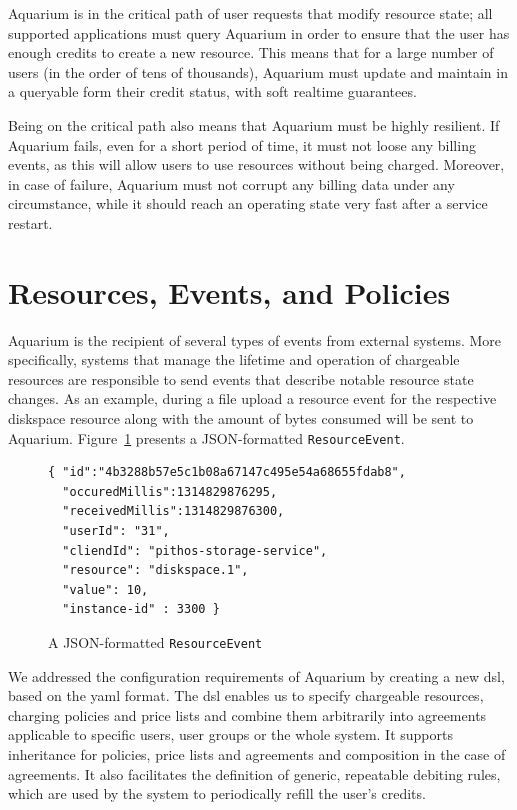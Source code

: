 \documentclass[letterpaper,twocolumn,10pt]{article}
\begin{document}
Aquarium is in the critical path of user requests that modify resource
state; all supported applications must query Aquarium in order to
ensure that the user has enough credits to create a new resource. This
means that for a large number of users (in the order of tens of thousands),
Aquarium must update and maintain in a queryable form their credit
status, with soft realtime guarantees.

Being on the critical path also means that Aquarium must be highly
resilient. If Aquarium fails, even for a short period of time, it must
not loose any billing events, as this will allow users to use
resources without being charged. Moreover, in case of failure,
Aquarium must not corrupt any billing data under any circumstance,
while it should reach an operating state very fast after a service
restart.

\section{Resources, Events, and Policies}

Aquarium is the recipient of several types of events from external
systems. More specifically, systems that manage the lifetime and
operation of chargeable resources are responsible to send events that
describe notable resource state changes. As an example, during a file upload a resource event for the respective \textsf{diskspace} resource along with the amount of bytes consumed will be sent to Aquarium.
Figure~\ref{fig:resevt} presents a JSON-formatted
\texttt{ResourceEvent}.

\begin{figure}
\lstset{language=C, basicstyle=\footnotesize,
stringstyle=\ttfamily, 
flexiblecolumns=true, aboveskip=-0.9em, belowskip=0em, lineskip=0em}

\begin{lstlisting}
{ "id":"4b3288b57e5c1b08a67147c495e54a68655fdab8",
  "occuredMillis":1314829876295,
  "receivedMillis":1314829876300,
  "userId": "31",
  "cliendId": "pithos-storage-service",
  "resource": "diskspace.1",
  "value": 10,
  "instance-id" : 3300 }
\end{lstlisting}
\caption{A JSON-formatted \texttt{ResourceEvent}} 
\label{fig:resevt}
\end{figure}

We addressed the configuration requirements of Aquarium by creating a
new {\sc dsl}, based on the {\sc yaml} format. The {\sc dsl} enables
us to specify chargeable resources, charging policies and
price lists and combine them arbitrarily into agreements applicable to
specific users, user groups or the whole system. It
supports inheritance for policies, price lists and agreements and
composition in the case of agreements. It also facilitates the
definition of generic, repeatable debiting rules, which are used
by the system to periodically refill the user's credits.
\end{document}
